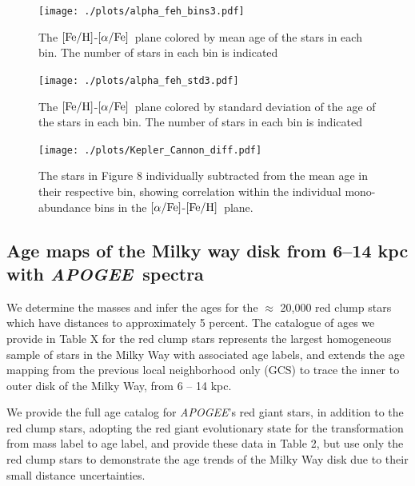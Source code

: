 \documentclass[12pt, preprint]{aastex}
\newcommand{\project}[1]{\textsl{#1}}
\newcommand{\apogee}{\project{APOGEE}}
\newcommand{\feh}{\mbox{$\rm [Fe/H]$}}
\newcommand{\alphafe}{\mbox{$\rm [\alpha/Fe]$}}
\begin{document}
\begin{figure}[p!]
\centering
 \texttt{[image: ./plots/alpha\_feh\_bins3.pdf]}
    \caption{The \feh-\alphafe\ plane colored by mean age of the stars in each bin. The number of stars in each bin is indicated }
\label{fig:alphabins}
\end{figure}

\begin{figure}[p!]
\centering
 \texttt{[image: ./plots/alpha\_feh\_std3.pdf]}
    \caption{The \feh-\alphafe\ plane colored by standard deviation of the age of the stars in each bin. The number of stars in each bin is indicated }
\label{fig:alphabins}
\end{figure}

\begin{figure}[p!]
\centering
 \texttt{[image: ./plots/Kepler\_Cannon\_diff.pdf]}
    \caption{The stars in Figure 8 individually subtracted from the mean age in their respective bin, showing correlation within the individual mono-abundance bins in the \alphafe-\feh\ plane. }
\label{fig:alphabins}
\end{figure}



\subsection{Age maps of the Milky way disk from 6--14 kpc with \apogee\ spectra}

We determine the masses and infer the ages for the $\approx$ 20,000 red clump stars which have distances to approximately 5 percent. The catalogue of ages we provide in Table X for the red clump stars represents the largest homogeneous sample of stars in the Milky Way with associated age labels, and extends the age mapping from the previous local neighborhood only (GCS) to trace the inner to outer disk of the Milky Way, from 6 -- 14 kpc.  

We provide the full age catalog for \apogee's red giant stars, in addition to the red clump stars, adopting the red giant evolutionary state for the transformation from mass label to age label, and provide these data in Table 2, but use only the red clump stars to demonstrate the age trends of the Milky Way disk due to their small distance uncertainties. 
\end{document}
